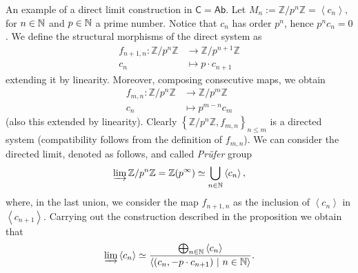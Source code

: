 \begin{ex}
	An example of a direct limit construction in $\mathsf{C} = \mathsf{Ab}$.
	Let $M_n := \mathbb{Z}/p^n\mathbb{Z} = \left\langle c_n \right\rangle$, for $n \in \mathbb{N}$ and $p \in \mathbb{N}$ a prime number.
	Notice that $c_n$ has order $p^n$, hence $p^n c_n = 0$.
	We define the structural morphisms of the direct system as
	\begin{align}
		f_{n+1, n}: \mathbb{Z}/p^n\mathbb{Z} &\to \mathbb{Z}/p^{n+1}\mathbb{Z} \\
		c_n &\mapsto p \cdot c_{n+1}
	\end{align} 
	extending it by linearity.
	Moreover, composing consecutive maps, we obtain
	\begin{align}
		f_{m, n}: \mathbb{Z}/p^n\mathbb{Z} &\to \mathbb{Z}/p^m\mathbb{Z} \\
		c_n &\mapsto p^{m-n} c_m
	\end{align} 
	(also this extended by linearity).
	Clearly $\left\{ \mathbb{Z}/p^n\mathbb{Z}, f_{m,n} \right\}_{n \leq m}$ is a directed system 
	(compatibility follows from the definition of $f_{m,n}$).
	We can consider the directed limit, denoted as follows, and called {\em Prüfer} group
	\begin{equation}
		\varinjlim \mathbb{Z}/p^n\mathbb{Z} = \mathbb{Z} (p^{\infty}) \simeq \bigcup_{n \in \mathbb{N}} \left\langle c_n \right\rangle
	,\end{equation} 
	where, in the last union, we consider the map $f_{n+1, n}$ as the inclusion of $\left\langle c_n \right\rangle$ in
	$\left\langle c_{n+1} \right\rangle$.
	Carrying out the construction described in the proposition we obtain that
	\begin{equation}
	\varinjlim \left\langle c_n \right\rangle \simeq
	\frac{\bigoplus_{n \in \mathbb{N}} \left\langle c_n \right\rangle}{\left\langle (c_n, -p \cdot c_{n+1}) \ \middle|\ n \in \mathbb{N} \right\rangle}
	.\end{equation} 
\end{ex} 

